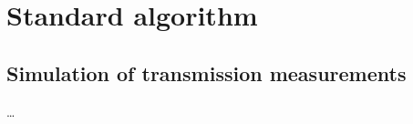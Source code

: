 \section{Standard algorithm}
\label{sec:rte:std}





\subsection{Simulation of transmission measurements}
\label{sec:rte:trans_sim}

\dots


